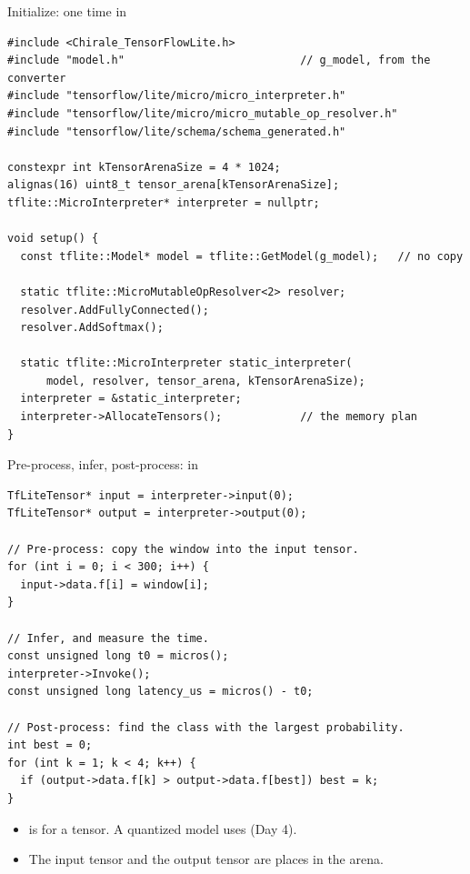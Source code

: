 \begin{frame}[fragile]{Initialize: one time in }
\begin{lstlisting}[style=cpp]
#include <Chirale_TensorFlowLite.h>
#include "model.h"                           // g_model, from the converter
#include "tensorflow/lite/micro/micro_interpreter.h"
#include "tensorflow/lite/micro/micro_mutable_op_resolver.h"
#include "tensorflow/lite/schema/schema_generated.h"

constexpr int kTensorArenaSize = 4 * 1024;
alignas(16) uint8_t tensor_arena[kTensorArenaSize];
tflite::MicroInterpreter* interpreter = nullptr;

void setup() {
  const tflite::Model* model = tflite::GetModel(g_model);   // no copy

  static tflite::MicroMutableOpResolver<2> resolver;
  resolver.AddFullyConnected();
  resolver.AddSoftmax();

  static tflite::MicroInterpreter static_interpreter(
      model, resolver, tensor_arena, kTensorArenaSize);
  interpreter = &static_interpreter;
  interpreter->AllocateTensors();            // the memory plan
}
\end{lstlisting}
\end{frame}

\begin{frame}[fragile]{Pre-process, infer, post-process: in }
\begin{lstlisting}[style=cpp]
TfLiteTensor* input = interpreter->input(0);
TfLiteTensor* output = interpreter->output(0);

// Pre-process: copy the window into the input tensor.
for (int i = 0; i < 300; i++) {
  input->data.f[i] = window[i];
}

// Infer, and measure the time.
const unsigned long t0 = micros();
interpreter->Invoke();
const unsigned long latency_us = micros() - t0;

// Post-process: find the class with the largest probability.
int best = 0;
for (int k = 1; k < 4; k++) {
  if (output->data.f[k] > output->data.f[best]) best = k;
}
\end{lstlisting}
  \small
  \begin{itemize}
    \item {} is for a  tensor. A quantized model
          uses  (Day 4).
    \item The input tensor and the output tensor are places in the arena.
  \end{itemize}
\end{frame}

